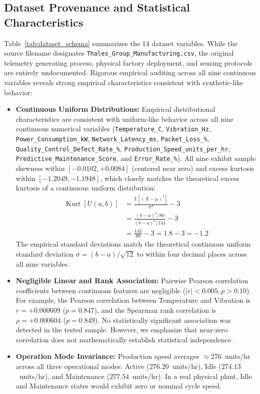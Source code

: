 \documentclass[journal]{IEEEtran}
\begin{document}
\subsection{Dataset Provenance and Statistical Characteristics}
Table~\ref{tab:dataset_schema} summarizes the 14 dataset variables. While the source filename designates \texttt{Thales\_Group\_Manufacturing.csv}, the original telemetry generating process, physical factory deployment, and sensing protocols are entirely undocumented. Rigorous empirical auditing across all nine continuous variables reveals strong empirical characteristics consistent with synthetic-like behavior:
\begin{itemize}
    \item \textbf{Continuous Uniform Distributions:} Empirical distributional characteristics are consistent with uniform-like behavior across all nine continuous numerical variables (\texttt{Temperature\_C}, \texttt{Vibration\_Hz}, \texttt{Power\_Consumption\_kW}, \texttt{Network\_Latency\_ms}, \texttt{Packet\_Loss\_\%}, \texttt{Quality\_Control\_Defect\_Rate\_\%}, \texttt{Production\_Speed\_units\_per\_hr}, \texttt{Predictive\_Maintenance\_Score}, and \texttt{Error\_Rate\_\%}). All nine exhibit sample skewness within $[-0.0102, +0.0084]$ (centered near zero) and excess kurtosis within $[-1.2049, -1.1948]$, which closely matches the theoretical excess kurtosis of a continuous uniform distribution:
    \begin{equation}
    \begin{aligned}
    \operatorname{Kurt}[U(a, b)] &= \frac{\mathbb{E}[(X-\mu)^4]}{\sigma^4} - 3 \\
    &= \frac{(b-a)^4 / 80}{(b-a)^4 / 144} - 3 \\
    &= \frac{144}{80} - 3 = 1.8 - 3 = -1.2
    \end{aligned}
    \end{equation}
    The empirical standard deviations match the theoretical continuous uniform standard deviation $\sigma = (b-a)/\sqrt{12}$ to within four decimal places across all nine variables.
    \item \textbf{Negligible Linear and Rank Association:} Pairwise Pearson correlation coefficients between continuous features are negligible ($|r| < 0.005, p > 0.10$). For example, the Pearson correlation between Temperature and Vibration is $r = +0.000609$ ($p = 0.847$), and the Spearman rank correlation is $\rho = +0.000604$ ($p = 0.849$). No statistically significant association was detected in the tested sample. However, we emphasize that near-zero correlation does not mathematically establish statistical independence.
    \item \textbf{Operation Mode Invariance:} Production speed averages $\approx 276$~units/hr across all three operational modes: Active ($276.20$~units/hr), Idle ($274.13$~units/hr), and Maintenance ($277.54$~units/hr). In a real physical plant, Idle and Maintenance states would exhibit zero or nominal cycle speed.
\end{itemize}
\end{document}
